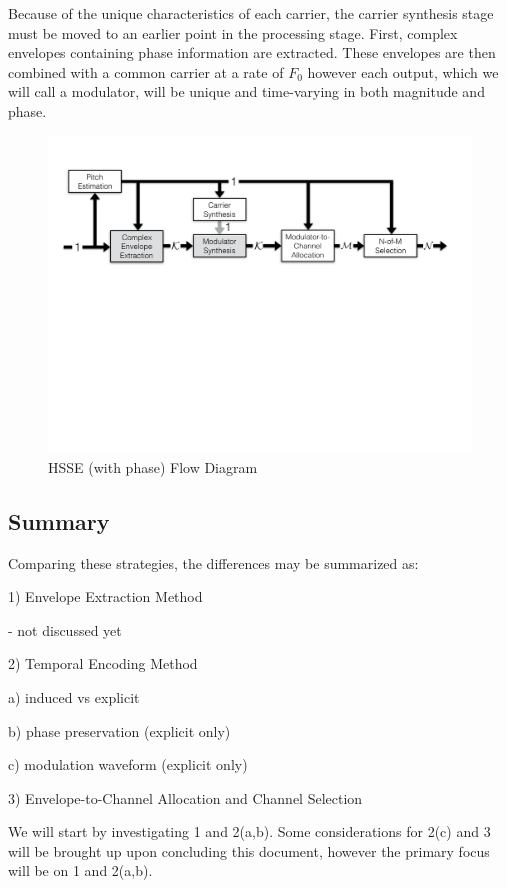 \documentclass [11pt, proquest,oneside] {uwthesis}[2015/03/03]
\begin{document}
Because of the unique characteristics of each carrier, the carrier synthesis stage must be moved to an earlier point in the processing stage.  First, complex envelopes containing phase information are extracted.  These envelopes are then combined with a common carrier at a rate of $F_0$ however each output, which we will call a modulator, will be unique and time-varying in both magnitude and phase.

\begin{figure}[!ht]
  \centering
    \includegraphics[width=1\textwidth]{HSSE_flow_diagram_Phase}   
    \caption{HSSE (with phase) Flow Diagram}
\end{figure}

\subsection{Summary}

Comparing these strategies, the differences may be summarized as:

1) Envelope Extraction Method

- not discussed yet

2) Temporal Encoding Method

a) induced vs explicit

b) phase preservation (explicit only)

c) modulation waveform (explicit only)

3) Envelope-to-Channel Allocation and Channel Selection

We will start by investigating 1 and 2(a,b).  Some considerations for 2(c) and 3 will be brought up upon concluding this document, however the primary focus will be on 1 and 2(a,b).
\end{document}

